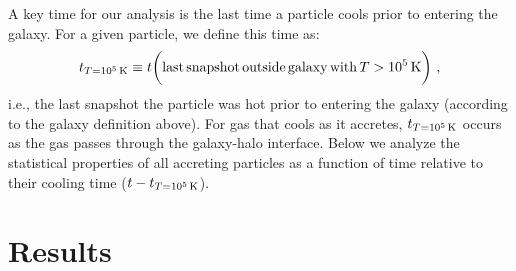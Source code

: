 \documentclass[fleqn,usenatbib]{mnras}
\newcommand{\tcon}{t_{T=10^5\,{\rm K}}}
\begin{document}
A key time for our analysis is the last time a particle cools prior to entering the galaxy.
For a given particle, we define this time as:
\begin{equation}
    \tcon \equiv t \bigg( {\rm last\,snapshot\,outside\,galaxy\,with\,}T>10^5\,{\rm K} \bigg) ~,
\label{e: tcon}
\end{equation}
i.e., the last snapshot the particle was hot prior to entering the galaxy (according to the galaxy definition above).
For gas that cools as it accretes, $\tcon$ occurs as the gas passes through the galaxy-halo interface.
Below we analyze the statistical properties of all accreting particles as a function of time relative to their cooling time ($t-\tcon$).

\section{Results}
\label{s: results}

\end{document}
